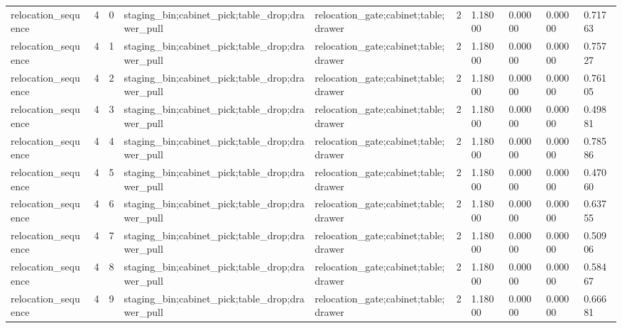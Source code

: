 \documentclass{article}
\begin{document}
\begin{table}[tbp]
{\begin{tabular}{llllllllll}
relocation\_sequence & 4 & 0 & staging\_bin;cabinet\_pick;table\_drop;drawer\_pull & relocation\_gate;cabinet;table;drawer & 2 & 1.18000 & 0.00000 & 0.00000 & 0.71763 \\
relocation\_sequence & 4 & 1 & staging\_bin;cabinet\_pick;table\_drop;drawer\_pull & relocation\_gate;cabinet;table;drawer & 2 & 1.18000 & 0.00000 & 0.00000 & 0.75727 \\
relocation\_sequence & 4 & 2 & staging\_bin;cabinet\_pick;table\_drop;drawer\_pull & relocation\_gate;cabinet;table;drawer & 2 & 1.18000 & 0.00000 & 0.00000 & 0.76105 \\
relocation\_sequence & 4 & 3 & staging\_bin;cabinet\_pick;table\_drop;drawer\_pull & relocation\_gate;cabinet;table;drawer & 2 & 1.18000 & 0.00000 & 0.00000 & 0.49881 \\
relocation\_sequence & 4 & 4 & staging\_bin;cabinet\_pick;table\_drop;drawer\_pull & relocation\_gate;cabinet;table;drawer & 2 & 1.18000 & 0.00000 & 0.00000 & 0.78586 \\
relocation\_sequence & 4 & 5 & staging\_bin;cabinet\_pick;table\_drop;drawer\_pull & relocation\_gate;cabinet;table;drawer & 2 & 1.18000 & 0.00000 & 0.00000 & 0.47060 \\
relocation\_sequence & 4 & 6 & staging\_bin;cabinet\_pick;table\_drop;drawer\_pull & relocation\_gate;cabinet;table;drawer & 2 & 1.18000 & 0.00000 & 0.00000 & 0.63755 \\
relocation\_sequence & 4 & 7 & staging\_bin;cabinet\_pick;table\_drop;drawer\_pull & relocation\_gate;cabinet;table;drawer & 2 & 1.18000 & 0.00000 & 0.00000 & 0.50906 \\
relocation\_sequence & 4 & 8 & staging\_bin;cabinet\_pick;table\_drop;drawer\_pull & relocation\_gate;cabinet;table;drawer & 2 & 1.18000 & 0.00000 & 0.00000 & 0.58467 \\
relocation\_sequence & 4 & 9 & staging\_bin;cabinet\_pick;table\_drop;drawer\_pull & relocation\_gate;cabinet;table;drawer & 2 & 1.18000 & 0.00000 & 0.00000 & 0.66681 \\
\bottomrule
\end{tabular}
}
\end{table}

\clearpage
\end{document}
